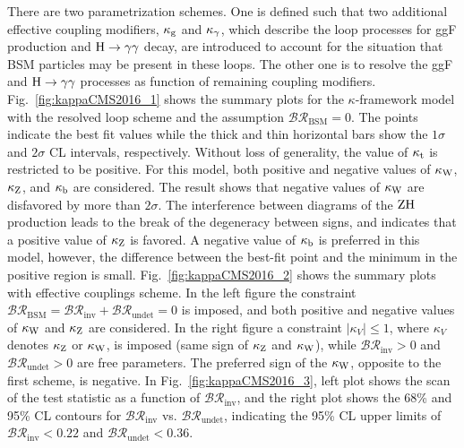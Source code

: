 There are two parametrization schemes. One is defined such that two additional effective coupling modifiers, $\kappa_{\mathrm{g}}$ and $\kappa_{\gamma}$, which describe the loop processes for ggF production and $\mathrm{H}\to\gamma\gamma$ decay, are introduced to account for the situation that BSM particles may be present in these loops. The other one is to resolve the ggF and $\mathrm{H}\to\gamma\gamma$ processes as function of remaining coupling modifiers. 
Fig.~\ref{fig:kappaCMS2016_1} shows the summary plots for the $\kappa$-framework model with the resolved loop scheme and the assumption $\mathcal{BR}_{\text{BSM}}=0$. The points indicate the best fit values while the thick and thin horizontal bars show the $1\sigma$ and $2\sigma$ CL intervals, respectively. Without loss of generality, the value of $\kappa_{\mathrm{t}}$ is restricted to be positive. For this model, both positive and negative values of $\kappa_{\mathrm{W}}$, $\kappa_{\mathrm{Z}}$, and $\kappa_{\mathrm{b}}$ are considered. The result shows that negative values of $\kappa_{\mathrm{W}}$ are disfavored by more than $2\sigma$. The interference between diagrams of the $\mathrm{Z}\mathrm{H}$ production leads to the break of the degeneracy between signs, and indicates that a positive value of $\kappa_{\mathrm{Z}}$ is favored. A negative value of $\kappa_{\mathrm{b}}$ is preferred in this model, however, the difference between the best-fit point and the minimum in the positive region is small. 
Fig.~\ref{fig:kappaCMS2016_2} shows the summary plots with effective couplings scheme. In the left figure the constraint $\mathcal{BR}_{\text{BSM}}=\mathcal{BR}_{\text{inv}}+\mathcal{BR}_{\text{undet}}=0$ is imposed, and both positive and negative values of $\kappa_{\mathrm{W}}$ and $\kappa_{\mathrm{Z}}$ are considered. In the right figure a constraint $|\kappa_{V}| \leq 1$, where $\kappa_{V}$ denotes $\kappa_{\mathrm{Z}}$ or $\kappa_{\mathrm{W}}$, is imposed (same sign of $\kappa_{\mathrm{Z}}$ and $\kappa_{\mathrm{W}}$), while $\mathcal{BR}_{\text{inv}} > 0$ and $\mathcal{BR}_{\text{undet}} > 0$ are free parameters. The preferred sign of the $\kappa_{\mathrm{W}}$, opposite to the first scheme, is negative. In Fig.~\ref{fig:kappaCMS2016_3}, left plot shows the scan of the test statistic as a function of $\mathcal{BR}_{\text{inv}}$, and the right plot shows the 68\% and 95\% CL contours for $\mathcal{BR}_{\text{inv}}$ vs. $\mathcal{BR}_{\text{undet}}$, indicating the 95\% CL upper limits of $\mathcal{BR}_{\text{inv}}<0.22$ and $\mathcal{BR}_{\text{undet}}<0.36$.

